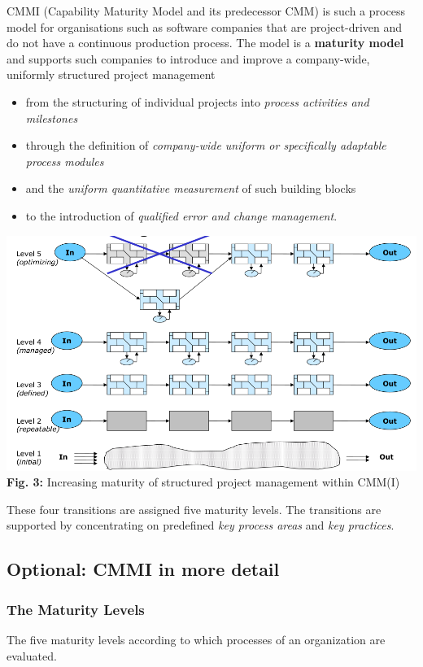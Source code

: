 \documentclass[11pt,a4paper]{article}
\begin{document}
CMMI (Capability Maturity Model and its predecessor CMM) is such a process
model for organisations such as software companies that are project-driven and
do not have a continuous production process. The model is a \textbf{maturity
  model} and supports such companies to introduce and improve a company-wide,
uniformly structured project management
\begin{itemize} [noitemsep]
\item from the structuring of individual projects into \emph{process
  activities and milestones}
\item through the definition of \emph{company-wide uniform or specifically
  adaptable process modules}
\item and the \emph{uniform quantitative measurement} of such building blocks
\item to the introduction of \emph{qualified error and change management}.
\end{itemize}
\begin{center}
  \includegraphics[width=.8\textwidth]{6.png}\\ \textbf{Fig. 3:} Increasing
  maturity of structured project management within CMM(I)
\end{center}
These four transitions are assigned five maturity levels. The transitions are
supported by concentrating on predefined \emph{key process areas} and
\emph{key practices}.

\subsection{Optional: CMMI in more detail}

\subsubsection{The Maturity Levels}

The five maturity levels according to which processes of an organization are
evaluated.
\end{document}
